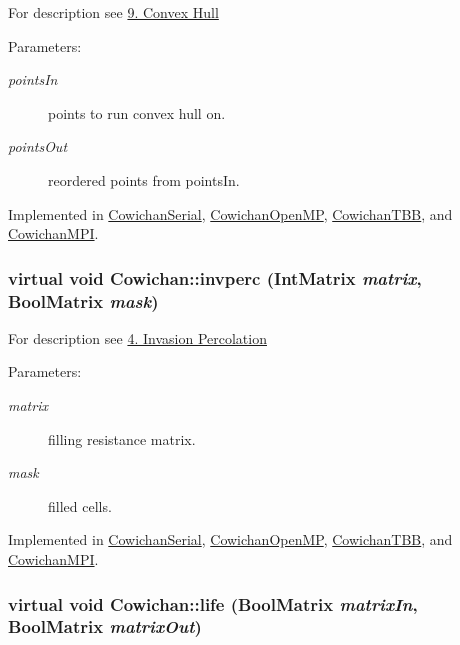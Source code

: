 For description see \hyperlink{index_hull_sec}{9. Convex Hull} \begin{Desc}
\item[Parameters:]
\begin{description}
\item[{\em pointsIn}]points to run convex hull on. \item[{\em pointsOut}]reordered points from pointsIn. \end{description}
\end{Desc}


Implemented in \hyperlink{class_cowichan_serial_e75cedf0a296dd7ad3dc41cadc51776f}{CowichanSerial}, \hyperlink{class_cowichan_open_m_p_cb444dd3e2c0f1f27f4135de0279d09e}{CowichanOpenMP}, \hyperlink{class_cowichan_t_b_b_0d23aa05dc21fd9e8b033769097b4b18}{CowichanTBB}, and \hyperlink{class_cowichan_m_p_i_22b3dce35fd93635bd4c1596e7fb839c}{CowichanMPI}.\hypertarget{class_cowichan_ea126792a31e54a8722663b7ea768955}{
\subsubsection[{invperc}]{\setlength{\rightskip}{0pt plus 5cm}virtual void Cowichan::invperc ({\bf IntMatrix} {\em matrix}, \/  {\bf BoolMatrix} {\em mask})}}
\label{class_cowichan_ea126792a31e54a8722663b7ea768955}


For description see \hyperlink{index_invperc_sec}{4. Invasion Percolation} \begin{Desc}
\item[Parameters:]
\begin{description}
\item[{\em matrix}]filling resistance matrix. \item[{\em mask}]filled cells. \end{description}
\end{Desc}


Implemented in \hyperlink{class_cowichan_serial_9b1cf3fcbb40498609826433b8ea2f6a}{CowichanSerial}, \hyperlink{class_cowichan_open_m_p_4824c6b8509b5da835fbc5f64eb3e063}{CowichanOpenMP}, \hyperlink{class_cowichan_t_b_b_e4f9f8c31feea9b3a167fc2880a97610}{CowichanTBB}, and \hyperlink{class_cowichan_m_p_i_bcd0f18fcccc8973ddaacf4dda190b53}{CowichanMPI}.\hypertarget{class_cowichan_d449595ef2fe934bdd128ac8b1f51d07}{
\subsubsection[{life}]{\setlength{\rightskip}{0pt plus 5cm}virtual void Cowichan::life ({\bf BoolMatrix} {\em matrixIn}, \/  {\bf BoolMatrix} {\em matrixOut})}}
\label{class_cowichan_d449595ef2fe934bdd128ac8b1f51d07}


